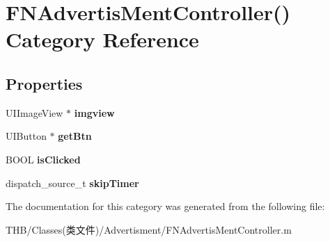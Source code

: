 \hypertarget{category_f_n_advertis_ment_controller_07_08}{}\section{F\+N\+Advertis\+Ment\+Controller() Category Reference}
\label{category_f_n_advertis_ment_controller_07_08}
\subsection*{Properties}
\begin{DoxyCompactItemize}
\item 
\mbox{\label{category_f_n_advertis_ment_controller_07_08_aa6eaa2233689cc0a4f420b2555f56eb4}} 
U\+I\+Image\+View $\ast$ {\bfseries imgview}
\item 
\mbox{\label{category_f_n_advertis_ment_controller_07_08_a5507bd4f29585a70c627e62eaf5a8b4c}} 
U\+I\+Button $\ast$ {\bfseries get\+Btn}
\item 
\mbox{\label{category_f_n_advertis_ment_controller_07_08_af34df795721a314267d63a5f1ca16558}} 
B\+O\+OL {\bfseries is\+Clicked}
\item 
\mbox{\label{category_f_n_advertis_ment_controller_07_08_ac2379783919145d3e162b1d1a8b81a49}} 
dispatch\+\_\+source\+\_\+t {\bfseries skip\+Timer}
\end{DoxyCompactItemize}


The documentation for this category was generated from the following file\+:\begin{DoxyCompactItemize}
\item 
T\+H\+B/\+Classes(类文件)/\+Advertisment/F\+N\+Advertis\+Ment\+Controller.\+m\end{DoxyCompactItemize}
